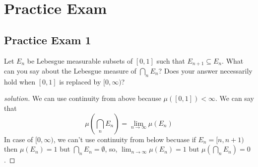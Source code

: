 \chapter{Practice Exam}
\section{Practice Exam 1}
\begin{problem}
  Let $E_n$ be Lebesgue measurable subsets of $[0, 1]$ such that $E_{n+1} \subseteq E_n$.
  What can you say about the Lebesgue measure of $\bigcap_n E_n$? Does your answer
  necessarily hold when $[0, 1]$ is replaced by $[0, \infty)$?
\end{problem}
\begin{proof}[solution]
  We can use continuity from above because $\mu([0, 1]) < \infty$.
  We can say that $$\mu\left(\bigcap_n E_n\right) = \lim_{n \to \infty} \mu(E_n)$$
  In case of $[0, \infty)$, we can't use continuity from below becuase if $E_n = [n, n+1)$
  then $\mu(E_n) = 1$ but $\bigcap_n E_n = \emptyset$, so, $\lim_{n\to \infty}\mu(E_n) = 1$ but 
  $\mu\left(\bigcap_n E_n\right) = 0$.
\end{proof}

\begin{problem}
  
\end{problem}
